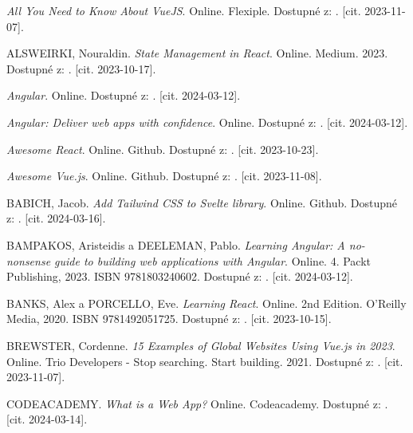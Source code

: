 

\begin{thebibliography}{99}\radkovani[1.2]\raggedright
\label{chap:literatura}

\emph{All You Need to Know About VueJS}. Online. Flexiple. Dostupné z: . [cit. 2023-11-07].

\textsc{ALSWEIRKI}, Nouraldin. \emph{State Management in React}. Online. Medium. 2023. Dostupné z: . [cit. 2023-10-17].

\emph{Angular}. Online. Dostupné z: . [cit. 2024-03-12].

\emph{Angular: Deliver web apps with confidence}. Online. Dostupné z: . [cit. 2024-03-12].

\emph{Awesome React}. Online. Github. Dostupné z: . [cit. 2023-10-23].

\emph{Awesome Vue.js}. Online. Github. Dostupné z: . [cit. 2023-11-08].

\textsc{BABICH}, Jacob. \emph{Add Tailwind CSS to Svelte library}. Online. Github. Dostupné z: . [cit. 2024-03-16].

\textsc{BAMPAKOS}, Aristeidis a \textsc{DEELEMAN}, Pablo. \emph{Learning Angular: A no-nonsense guide to building web applications with Angular}. Online. 4. Packt Publishing, 2023. ISBN 9781803240602. Dostupné z: . [cit. 2024-03-12].

\textsc{BANKS}, Alex a \textsc{PORCELLO}, Eve. \emph{Learning React}. Online. 2nd Edition. O'Reilly Media, 2020. ISBN 9781492051725. Dostupné z: . [cit. 2023-10-15].

\textsc{BREWSTER}, Cordenne. \emph{15 Examples of Global Websites Using Vue.js in 2023}. Online. Trio Developers - Stop searching. Start building. 2021. Dostupné z: . [cit. 2023-11-07].

\textsc{CODEACADEMY}. \emph{What is a Web App?} Online. Codeacademy. Dostupné z: . [cit. 2024-03-14].


\end{thebibliography}
